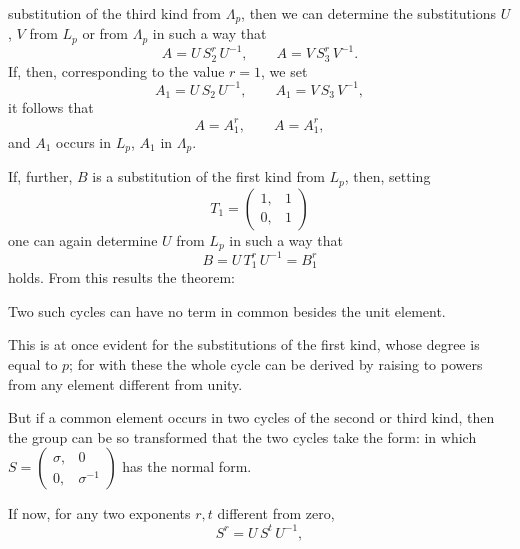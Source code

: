 substitution of the third kind from $\Lambda_p$, then we can determine
the substitutions $U$, $V$ from $L_p$ or from $\Lambda_p$ in such a way that
\[
A = U\,S_2^r\,U^{-1}, \qquad A = V\,S_3^r\,V^{-1}.
\]
If, then, corresponding to the value $r=1$, we set
\[
A_1 = U\,S_2\,U^{-1}, \qquad A_1 = V\,S_3\,V^{-1},
\]
it follows that
\[
A = A_1^r, \qquad A = A_1^r,
\]
and $A_1$ occurs in $L_p$, $A_1$ in $\Lambda_p$.

If, further, $B$ is a substitution of the first kind from $L_p$, then,
setting
\[
T_1 = \begin{pmatrix} 1, & 1 \\ 0, & 1 \end{pmatrix}
\]
one can again determine $U$ from $L_p$ in such a way that
\[
B = U\,T_1^r\,U^{-1} = B_1^r
\]
holds. From this results the theorem:


Two such cycles can have no term in common besides the
unit element.

This is at once evident for the substitutions of the first
kind, whose degree is equal to $p$; for with these the whole
cycle can be derived by raising to powers from any element
different from unity.

But if a common element occurs in two cycles of the
second or third kind, then the group can be so transformed
that the two cycles take the form:
in which $S = \begin{pmatrix} \sigma, & 0 \\ 0, & \sigma^{-1} \end{pmatrix}$ has the normal form.

If now, for any two exponents
$r,t$ different from zero,
\[
S^r = U\,S^t\,U^{-1},
\]
